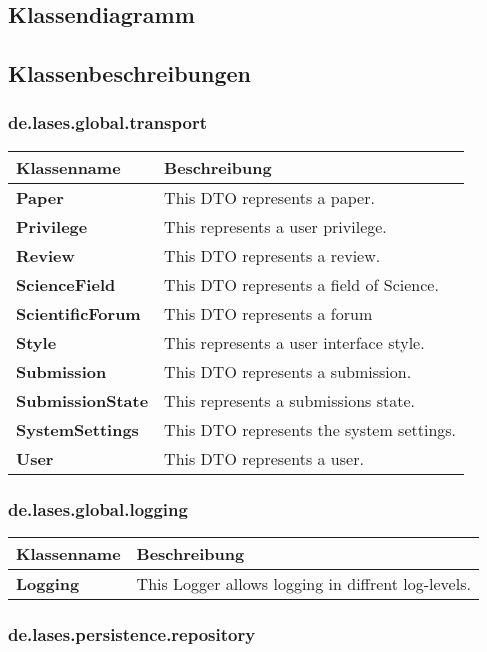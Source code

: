 
\newcommand{\classtable}[1]{\begin{longtable}[H]{m{5cm}m{9cm}}
		\hline
		\textbf{Klassenname} & \textbf{Beschreibung} \\
		\hline
		\hline
		#1
	\end{longtable}
}

\newcommand{\classentry}[2]{\textbf{#1} & #2 \\
	}


\subsection{Klassendiagramm}


\subsection{Klassenbeschreibungen}

\subsubsection{de.lases.global.transport}

\classtable{
    \classentry{Paper}{This DTO represents a paper.}
    \classentry{Privilege}{This represents a user privilege.}
    \classentry{Review}{This DTO represents a review.}
    \classentry{ScienceField}{This DTO represents a field of Science.}
    \classentry{ScientificForum}{This DTO represents a forum}
    \classentry{Style}{This represents a user interface style.}
    \classentry{Submission}{This DTO represents a submission.}
    \classentry{SubmissionState}{This represents a submissions state.}
    \classentry{SystemSettings}{This DTO represents the system settings.}
    \classentry{User}{This DTO represents a user.}
}

\subsubsection{de.lases.global.logging}

\classtable{
	\classentry{Logging}{This Logger allows logging in diffrent log-levels.}
}

\subsubsection{de.lases.persistence.repository}

